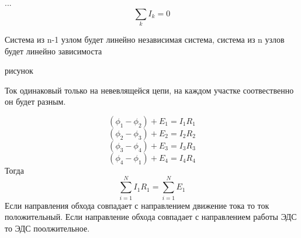 \documentclass[../main.tex]{subfiles}
\begin{document}
...
\[\sum_{k} I_k = 0\]

Система из n-1 узлом будет линейно независимая система, система из n узлов будет линейно зависимоста

рисунок

Ток одинаковый только на невевлящейся цепи, на каждом участке соотвественно он будет разным.

\[(\phi_1 - \phi_2) + E_1 = I_1 R_1\]
\[(\phi_2 - \phi_3) + E_2 = I_2 R_2\]
\[(\phi_3 - \phi_4) + E_3 = I_3 R_3\]
\[(\phi_4 - \phi_1) + E_4 = I_4 R_4\]
Тогда
\[\sum_{i=1}^{N} I_1 R_1 = \sum_{i = 1}^{N} E_1\]
Если направления обхода совпадает с направлением движение тока то ток положительный. Если направление обхода совпадает с направлением работы ЭДС то ЭДС поолжительное.
\end{document}
